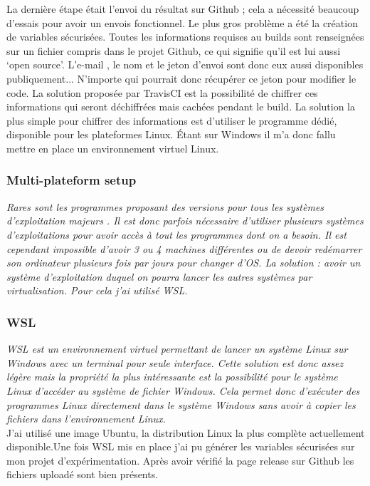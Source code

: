 \documentclass[french,a4paper,12pt]{report}
\begin{document}
La dernière étape était l’envoi du résultat sur Github ; cela a nécessité beaucoup d'essais pour avoir un envois fonctionnel. Le plus gros problème a été la création de variables sécurisées. Toutes les informations requises au builds sont renseignées sur un fichier compris dans le projet Github, ce qui signifie qu’il est lui aussi ‘open source’. L’e-mail , le nom et le jeton d’envoi sont donc eux aussi disponibles publiquement... N’importe qui pourrait donc récupérer ce jeton pour modifier le code. La solution proposée par TravisCI est la possibilité de chiffrer ces informations qui seront déchiffrées mais cachées pendant le build. La solution la plus simple pour chiffrer des informations est d’utiliser le programme dédié, disponible pour les plateformes Linux. Étant sur Windows il m’a donc fallu mettre en place un environnement virtuel Linux.

\subsubsection{Multi-plateform setup}

\textit{Rares sont les programmes proposant des versions pour tous les systèmes d’exploitation majeurs . Il est donc parfois nécessaire d’utiliser plusieurs systèmes d’exploitations pour avoir accès à tout les programmes dont on a besoin.  Il est cependant impossible d’avoir 3 ou 4 machines différentes ou de devoir redémarrer son ordinateur plusieurs fois par jours pour changer d’OS. La solution : avoir un système d’exploitation duquel on pourra lancer les autres systèmes par virtualisation. Pour cela j’ai utilisé WSL.}

\subsubsection{WSL}

\textit{WSL est un environnement virtuel permettant de lancer un système Linux sur Windows avec un terminal pour seule interface. Cette solution est donc assez légère mais la propriété la plus intéressante est la possibilité pour le système Linux d’accéder au système de fichier Windows. Cela permet donc d’exécuter des programmes Linux directement dans le système Windows sans avoir à copier les fichiers dans l’environnement Linux.}\\

J’ai utilisé une image Ubuntu, la distribution Linux la plus complète actuellement disponible.Une fois WSL mis en place j’ai pu générer les variables sécurisées sur mon projet d'expérimentation. Après avoir vérifié la page release sur Github les fichiers uploadé sont bien présents.
\end{document}
